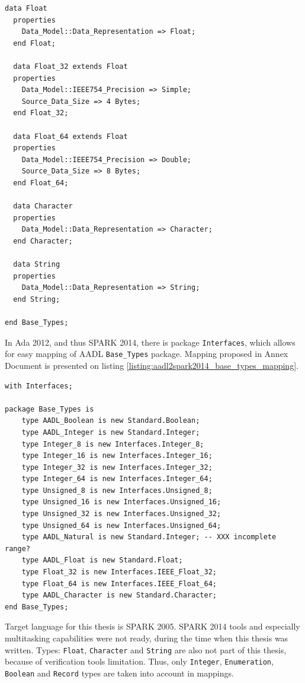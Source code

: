\begin{lstlisting}[language=aadl, frame=single, gobble=0, caption={AADL Base\_Types package}, label={listing:aadl_base_types}]
  data Float 
  properties
    Data_Model::Data_Representation => Float;
  end Float;

  data Float_32 extends Float 
  properties 
    Data_Model::IEEE754_Precision => Simple; 
    Source_Data_Size => 4 Bytes; 
  end Float_32; 

  data Float_64 extends Float 
  properties 
    Data_Model::IEEE754_Precision => Double; 
    Source_Data_Size => 8 Bytes; 
  end Float_64;

  data Character
  properties
    Data_Model::Data_Representation => Character;
  end Character;

  data String
  properties
    Data_Model::Data_Representation => String;
  end String;

end Base_Types;
\end{lstlisting} 
\doublespacing

In Ada 2012, and thus SPARK 2014, there is package \lstinline{Interfaces}, which allows for easy mapping of AADL \lstinline{Base_Types} package. Mapping proposed in Annex Document \cite{AnnexDoc} is presented on listing \ref{listing:aadl2spark2014_base_types_mapping}.

\singlespacing
\begin{lstlisting}[language=aadl, frame=single, gobble=0, caption={Mapping of Base\_Types for SPARK 2014}, label={listing:aadl2spark2014_base_types_mapping}]
with Interfaces;

package Base_Types is
	type AADL_Boolean is new Standard.Boolean;
	type AADL_Integer is new Standard.Integer;
 	type Integer_8 is new Interfaces.Integer_8;
 	type Integer_16 is new Interfaces.Integer_16;
	type Integer_32 is new Interfaces.Integer_32;
	type Integer_64 is new Interfaces.Integer_64;
	type Unsigned_8 is new Interfaces.Unsigned_8;
	type Unsigned_16 is new Interfaces.Unsigned_16;
	type Unsigned_32 is new Interfaces.Unsigned_32;
	type Unsigned_64 is new Interfaces.Unsigned_64;
	type AADL_Natural is new Standard.Integer; -- XXX incomplete range? 
	type AADL_Float is new Standard.Float;
	type Float_32 is new Interfaces.IEEE_Float_32;
	type Float_64 is new Interfaces.IEEE_Float_64;
  	type AADL_Character is new Standard.Character;
end Base_Types;
\end{lstlisting} 
\doublespacing

Target language for this thesis is SPARK 2005. SPARK 2014 tools and especially multitasking capabilities were not ready, during the time when this thesis was written. Types: \lstinline{Float}, \lstinline{Character} and \lstinline{String} are also not part of this thesis, because of verification tools limitation. Thus, only \lstinline{Integer}, \lstinline{Enumeration}, \lstinline{Boolean} and \lstinline{Record} types are taken into account in mappings.

